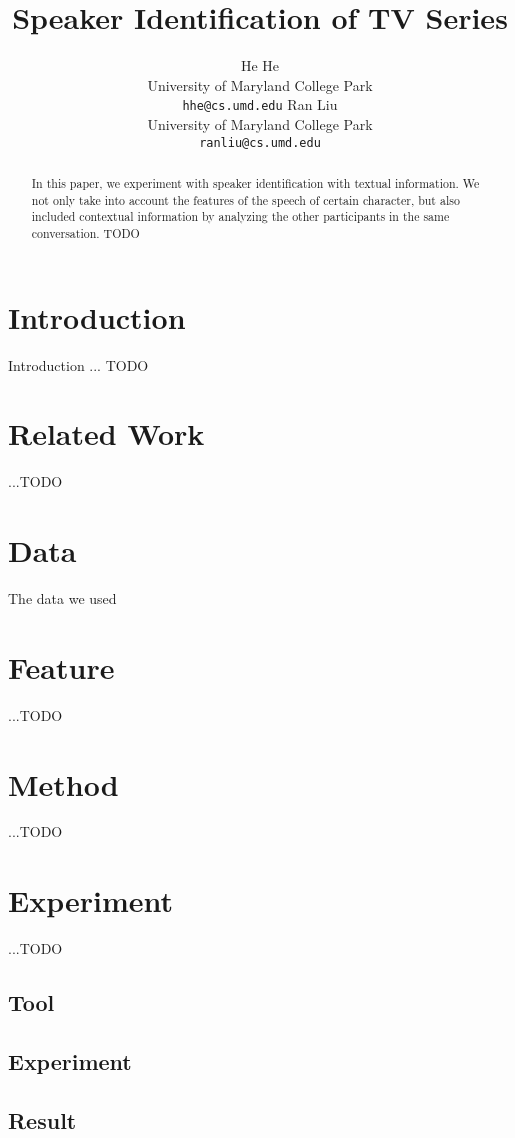 \documentclass[11pt,letterpaper]{article}
\title{Speaker Identification of TV Series}%
\author{He He\\
	University of Maryland College Park\\
	    {\tt hhe@cs.umd.edu}
	  \And
	Ran Liu\\
  	University of Maryland College Park\\
  {\tt ranliu@cs.umd.edu}}
\date{}
\begin{document}
\maketitle
\begin{abstract}
In this paper, we experiment with speaker identification with textual information. We not only take into account the features of the speech of certain character, but also included contextual information by analyzing  the other participants in the same conversation. 
TODO
\end{abstract}

\section{Introduction}

Introduction ...
TODO


\section{Related Work}

...TODO

\section{Data}
The data we used
\section{Feature}
...TODO
\section{Method}
...TODO

\section{Experiment}
	
...TODO
\subsection {Tool}
\subsection {Experiment}
\subsection {Result}
\end{document}
